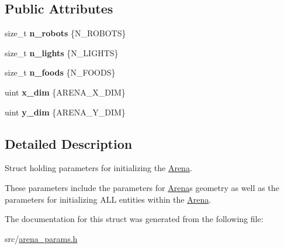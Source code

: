 \subsection*{Public Attributes}
\begin{DoxyCompactItemize}
\item 
size\+\_\+t {\bfseries n\+\_\+robots} \{N\+\_\+\+R\+O\+B\+O\+TS\}\hypertarget{structarena__params_a6ae235113b4a6870d502c913c65ad9a2}{}\label{structarena__params_a6ae235113b4a6870d502c913c65ad9a2}

\item 
size\+\_\+t {\bfseries n\+\_\+lights} \{N\+\_\+\+L\+I\+G\+H\+TS\}\hypertarget{structarena__params_a98012558dd0075a9f0df9f38140c5bbd}{}\label{structarena__params_a98012558dd0075a9f0df9f38140c5bbd}

\item 
size\+\_\+t {\bfseries n\+\_\+foods} \{N\+\_\+\+F\+O\+O\+DS\}\hypertarget{structarena__params_a4160066249e38b463e638d0f8478a5c1}{}\label{structarena__params_a4160066249e38b463e638d0f8478a5c1}

\item 
uint {\bfseries x\+\_\+dim} \{A\+R\+E\+N\+A\+\_\+\+X\+\_\+\+D\+IM\}\hypertarget{structarena__params_afa86b434ed8ea5a4fe9ae14ae1438e8f}{}\label{structarena__params_afa86b434ed8ea5a4fe9ae14ae1438e8f}

\item 
uint {\bfseries y\+\_\+dim} \{A\+R\+E\+N\+A\+\_\+\+Y\+\_\+\+D\+IM\}\hypertarget{structarena__params_ab5d50b9affa9c753c15e1d6f088824af}{}\label{structarena__params_ab5d50b9affa9c753c15e1d6f088824af}

\end{DoxyCompactItemize}


\subsection{Detailed Description}
Struct holding parameters for initializing the \hyperlink{classArena}{Arena}. 

These parameters include the parameters for \hyperlink{classArena}{Arena}\textquotesingle{}s geometry as well as the parameters for initializing A\+LL entities within the \hyperlink{classArena}{Arena}. 

The documentation for this struct was generated from the following file\+:\begin{DoxyCompactItemize}
\item 
src/\hyperlink{arena__params_8h}{arena\+\_\+params.\+h}\end{DoxyCompactItemize}

